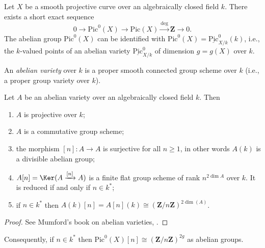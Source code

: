 \noindent
Let $X$ be a smooth projective curve over an algebraically closed field $k$.
There exists a short exact sequence
$$
0\to \text{Pic}^0(X) \to \text{Pic}(X)\xrightarrow{\deg} \mathbf{Z} \to 0.
$$
The abelian group $\text{Pic}^0(X)$ can be identified with $\text{Pic}^0(X) =
\underline{\text{Pic}}^0_{X/k}(k)$, i.e., the $k$-valued points of an
abelian variety $\underline{\text{Pic}}^0_{X/k}$ of dimension $g=g(X)$ over
$k$.

\begin{definition}
\label{definition-abelian-variety}
An {\it abelian variety} over $k$ is a proper smooth connected group scheme
over $k$ (i.e., a proper group variety over $k$).
\end{definition}

\begin{proposition}
\label{proposition-review-abelian-varieties}
Let $A$ be an abelian variety over an algebraically closed field $k$. Then
\begin{enumerate}
\item
$A$ is projective over $k$;
\item
$A$ is a commutative group scheme;
\item
the morphism $[n]: A\to A$ is surjective for all $n\geq 1$, in other words
$A(k)$ is a divisible abelian group;
\item
$A[n] = \Ker(A\xrightarrow{[n]} A)$ is a finite flat group scheme of rank
$n^{2\dim A}$ over $k$. It is reduced if and only if $n\in k^*$;
\item
if $n\in k^*$ then $A(k)[n] = A[n](k)\cong(\mathbf{Z}/n\mathbf{Z})^{2\dim(A)}$.
\end{enumerate}
\end{proposition}

\begin{proof}
See Mumford's book on abelian varieties, \cite{AVar}.
\end{proof}

\noindent
Consequently, if $n\in k^*$ then $\text{Pic}^0(X)[n] \cong
\left(\mathbf{Z}/n\mathbf{Z}\right)^{2g}$ as abelian groups.

